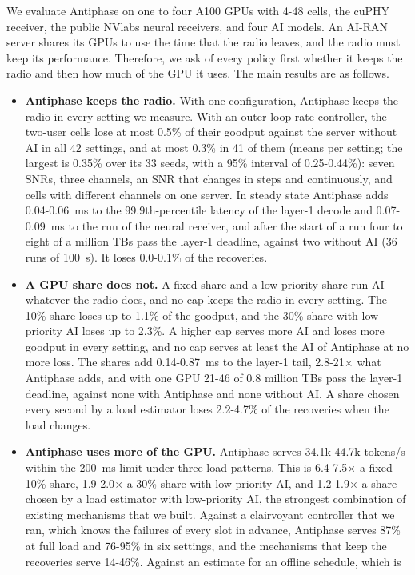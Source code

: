 \documentclass[acmsmall,screen,review,anonymous]{acmart}
\newcommand{\sys}{Antiphase\xspace}
\begin{document}
We evaluate \sys on one to four A100 GPUs with 4-48 cells, the cuPHY receiver, the public NVlabs neural
receivers, and four AI models. An AI-RAN server shares its GPUs to use the time that the radio leaves, and the
radio must keep its performance. Therefore, we ask of every policy first whether it keeps the radio and then
how much of the GPU it uses. The main results are as follows.
\begin{itemize}
\item \textbf{\sys keeps the radio.} With one configuration, \sys keeps the radio in every setting we
measure. With an outer-loop rate controller, the two-user cells lose at most 0.5\% of their goodput against
the server without AI in all 42 settings, and at most 0.3\% in 41 of them (means per setting; the largest is 0.35\% over its 33 seeds, with a 95\% interval of 0.25-0.44\%): seven SNRs, three channels, an SNR that changes in steps and
continuously, and cells with different channels on one server. In steady state \sys adds 0.04-0.06~ms to the 99.9th-percentile
latency of the layer-1 decode and 0.07-0.09~ms to the run of the neural receiver, and after the start of a
run four to eight of a million TBs pass the layer-1 deadline, against two without AI (36 runs of 100~s). It loses 0.0-0.1\% of the recoveries.
\item \textbf{A GPU share does not.} A fixed share and a low-priority share run AI whatever the radio does,
and no cap keeps the radio in every setting. The 10\% share loses up to 1.1\% of the goodput, and the 30\%
share with low-priority AI loses up to 2.3\%. A higher cap serves more AI and loses more goodput in every
setting, and no cap serves at least the AI of \sys at no more loss. The shares add 0.14-0.87~ms to the layer-1 tail, 2.8-21$\times$
what \sys adds, and with one GPU 21-46 of 0.8 million TBs pass the layer-1 deadline, against none with \sys
and none without AI. A share chosen every second by a load estimator loses 2.2-4.7\% of the recoveries when
the load changes.
\item \textbf{\sys uses more of the GPU.} \sys serves 34.1k-44.7k tokens/s within the 200~ms limit under
three load patterns. This is 6.4-7.5$\times$ a fixed 10\% share, 1.9-2.0$\times$ a 30\% share with
low-priority AI, and 1.2-1.9$\times$ a share chosen by a load estimator with low-priority AI, the strongest
combination of existing mechanisms that we built. Against a clairvoyant controller that we ran, which knows the failures of every slot in advance,
\sys serves 87\% at full load and 76-95\% in six settings, and the
mechanisms that keep the recoveries serve 14-46\%. Against an estimate for an offline schedule, which is

\end{itemize}
\end{document}
